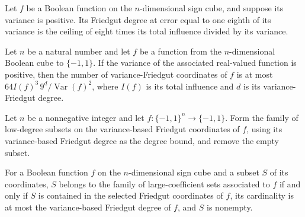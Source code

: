 \begin{theorem}
\label{FABL.varianceFriedgutDegree_eq}
\leanok
{}
Let $f$ be a Boolean function on the $n$-dimensional sign cube, and suppose its variance
is positive. Its Friedgut degree at error equal to one eighth of its variance is the
ceiling of eight times its total influence divided by its variance.
\end{theorem}

\begin{theorem}
\label{FABL.card_varianceFriedgutCoordinates_le}
\leanok
{}
Let $n$ be a natural number and let $f$ be a function from the $n$-dimensional Boolean
cube to $\{-1,1\}$. If the variance of the associated real-valued function is positive,
then the number of variance-Friedgut coordinates of $f$ is at most $64
I(f)^3\,9^d/\operatorname{Var}(f)^2$, where $I(f)$ is its total influence and $d$ is its
variance-Friedgut degree.
\end{theorem}

\begin{definition}
\label{FABL.varianceLargeCoeffFamily}
\leanok
{}
Let $n$ be a nonnegative integer and let $f:\{-1,1\}^n\to\{-1,1\}$. Form the family of
low-degree subsets on the variance-based Friedgut coordinates of $f$, using its
variance-based Friedgut degree as the degree bound, and remove the empty subset.
\end{definition}

\begin{theorem}
\label{FABL.mem_varianceLargeCoeffFamily}
\leanok
{}
For a Boolean function $f$ on the $n$-dimensional sign cube and a subset $S$ of its
coordinates, $S$ belongs to the family of large-coefficient sets associated to $f$ if
and only if $S$ is contained in the selected Friedgut coordinates of $f$, its
cardinality is at most the variance-based Friedgut degree of $f$, and $S$ is nonempty.
\end{theorem}

